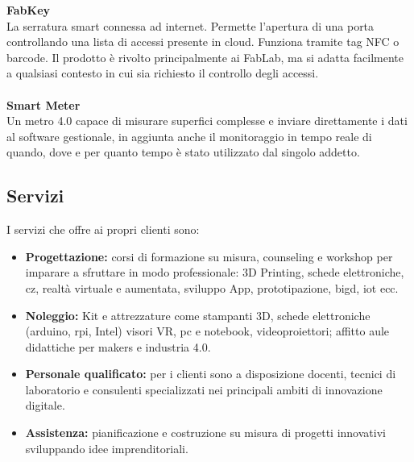 \noindent \textbf{FabKey}
\\
La serratura smart connessa ad internet. Permette l'apertura di una porta controllando una lista di accessi presente in cloud. Funziona tramite tag \gls{NFC} o barcode. Il prodotto è rivolto principalmente ai \gls{FabLab}, ma si adatta facilmente a qualsiasi contesto in cui sia richiesto il controllo degli accessi.
\\
\\
\textbf{Smart Meter}
\\
Un metro 4.0 capace di misurare superfici complesse e inviare direttamente i dati al software gestionale, in aggiunta anche il monitoraggio in tempo reale di quando, dove e per quanto tempo è stato utilizzato dal singolo addetto.

\subsection{Servizi}
I servizi che \lab{} offre ai propri clienti sono:
\begin{itemize}
\item \textbf{Progettazione:} corsi di formazione su misura, \gls{counseling} e \gls{workshop} per imparare a sfruttare in modo professionale: 3D Printing, schede elettroniche, \gls{cz}, realtà virtuale e aumentata, sviluppo App, prototipazione, \gls{bigd}, \gls{iot} ecc.
\item \textbf{Noleggio:} Kit e attrezzature come stampanti 3D, schede elettroniche (\gls{arduino}, \gls{rpi}, Intel) visori VR, pc e notebook, videoproiettori; affitto aule didattiche per \gls{makers} e industria 4.0.
\item \textbf{Personale qualificato:} per i clienti sono a disposizione docenti, tecnici di laboratorio e consulenti specializzati nei principali ambiti di innovazione digitale.
\item \textbf{Assistenza:} pianificazione e costruzione su misura di progetti innovativi sviluppando idee imprenditoriali.
\end{itemize}


